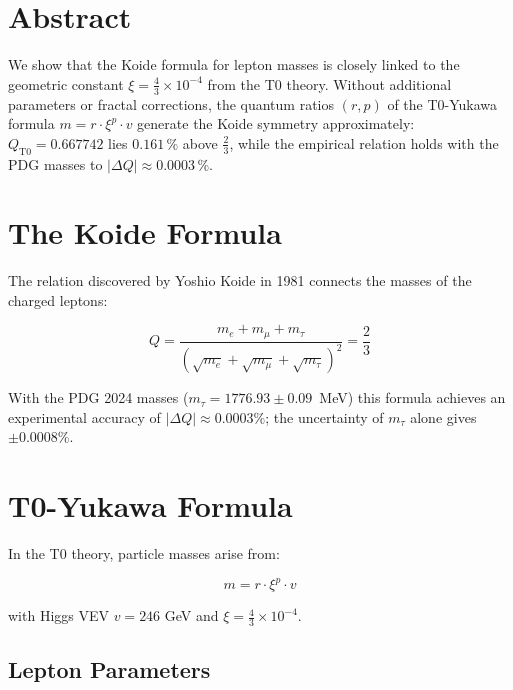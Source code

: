 \section*{Abstract}
		We show that the Koide formula for lepton masses is closely linked to the geometric constant $\xi = \frac{4}{3} \times 10^{-4}$ from the T0 theory. Without additional parameters or fractal corrections, the quantum ratios $(r,p)$ of the T0-Yukawa formula $m = r \cdot \xi^p \cdot v$ generate the Koide symmetry approximately: $Q_{\text{T0}} = 0.667742$ lies $0.161\,\%$ above $\frac{2}{3}$, while the empirical relation holds with the PDG masses to $|\Delta Q| \approx 0.0003\,\%$.

	
	\section{The Koide Formula}
	
	The relation discovered by Yoshio Koide in 1981 connects the masses of the charged leptons:
	
	\begin{equation}
		Q = \frac{m_e + m_\mu + m_\tau}{\left( \sqrt{m_e} + \sqrt{m_\mu} + \sqrt{m_\tau} \right)^2} = \frac{2}{3}
		\label{eq:koide}
	\end{equation}
	
	With the PDG 2024 masses ($m_\tau = 1776.93 \pm 0.09$~MeV) this formula achieves an experimental accuracy of $|\Delta Q| \approx 0.0003\%$; the uncertainty of $m_\tau$ alone gives $\pm 0.0008\%$.
	
	\section{T0-Yukawa Formula}
	
	In the T0 theory, particle masses arise from:
	
	\begin{equation}
		m = r \cdot \xi^p \cdot v
		\label{eq:t0yukawa}
	\end{equation}
	
	with Higgs VEV $v = 246$ GeV and $\xi = \frac{4}{3} \times 10^{-4}$.
	
	\subsection{Lepton Parameters}
	
	\begin{table}[h]
		\centering
		\caption{T0 Quantum Ratios of the Charged Leptons}
	\end{table}
	
